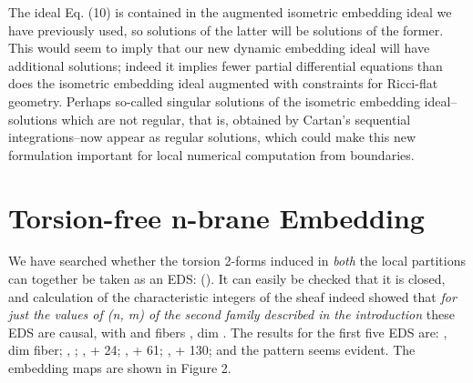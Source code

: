 \documentclass[a4paper,a4paper]{article}
\begin{document}
         The ideal Eq. (10) is contained in the augmented isometric
embedding ideal we have previously used,  so solutions of the latter
will be solutions of the former.  This would seem to imply that our new dynamic embedding
ideal will have additional solutions; indeed it implies fewer partial
differential equations than does the isometric embedding ideal augmented with
constraints for Ricci-flat geometry.  Perhaps so-called singular
solutions of the isometric embedding ideal--solutions which are not regular,  that is,
obtained by Cartan's sequential integrations--now appear as regular
solutions, which could make this new formulation important for local numerical
computation from boundaries.


\section{Torsion-free  n-brane Embedding}

 We have searched whether the torsion 2-forms induced in {\itshape both}
the local partitions can together be taken as an EDS:
(\coordHE{}).
It can easily be checked that it is closed,  and calculation
of the characteristic integers of the sheaf indeed showed that
{\itshape for just the values of (n, m) of the second family described in the
introduction} these EDS are  causal,  with \coordHE{} and fibers \coordHE{}, dim \coordHE{}.  The results for the first five EDS
are:
\coordHE{},  \coordHE{} dim fiber; \coordHE{}, \coordHE{}; \coordHE{}, \coordHE{} + 24;  \coordHE{}, \coordHE{} + 61;  \coordHE{}, \myHighlight{$231\{0, 21, 20, 19, 18, 17]6$}\coordHE{} + 130; and the pattern
seems evident.  The embedding maps are shown in Figure 2.
\end{document}
